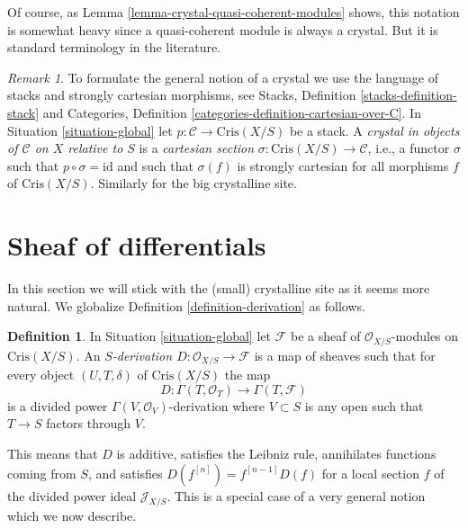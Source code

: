 \documentclass{stacks-project}
\theoremstyle{plain}
\theoremstyle{definition}
\newtheorem{definition}[subsection]{Definition}
\theoremstyle{remark}
\newtheorem{remark}[subsection]{Remark}
\numberwithin{equation}{subsection}
\begin{document}
\noindent
Of course, as Lemma \ref{lemma-crystal-quasi-coherent-modules} shows, this
notation is somewhat heavy since a quasi-coherent module is always a crystal.
But it is standard terminology in the literature.

\begin{remark}
\label{remark-crystal}
To formulate the general notion of a crystal we use the language
of stacks and strongly cartesian morphisms, see
Stacks, Definition \ref{stacks-definition-stack} and
Categories, Definition \ref{categories-definition-cartesian-over-C}.
In Situation \ref{situation-global} let
$p : \mathcal{C} \to \text{Cris}(X/S)$ be a stack.
A {\it crystal in objects of $\mathcal{C}$ on $X$ relative to $S$}
is a {\it cartesian section} $\sigma : \text{Cris}(X/S) \to \mathcal{C}$,
i.e., a functor $\sigma$ such that $p \circ \sigma = \text{id}$
and such that $\sigma(f)$ is strongly cartesian for all
morphisms $f$ of $\text{Cris}(X/S)$. Similarly for the big crystalline site.
\end{remark}





\section{Sheaf of differentials}
\label{section-differentials-sheaf}

\noindent
In this section we will stick with the (small) crystalline site
as it seems more natural. We globalize
Definition \ref{definition-derivation} as follows.

\begin{definition}
\label{definition-global-derivation}
In Situation \ref{situation-global} let
$\mathcal{F}$ be a sheaf of $\mathcal{O}_{X/S}$-modules on
$\text{Cris}(X/S)$. An
{\it $S$-derivation $D : \mathcal{O}_{X/S} \to \mathcal{F}$}
is a map of sheaves such that for every object $(U, T, \delta)$ of
$\text{Cris}(X/S)$ the map
$$
D : \Gamma(T, \mathcal{O}_T) \longrightarrow \Gamma(T, \mathcal{F})
$$
is a divided power $\Gamma(V, \mathcal{O}_V)$-derivation where $V \subset S$
is any open such that $T \to S$ factors through $V$.
\end{definition}

\noindent
This means that $D$ is additive, satisfies the Leibniz rule, annihilates
functions coming from $S$, and satisfies $D(f^{[n]}) = f^{[n - 1]}D(f)$
for a local section $f$ of the divided power ideal $\mathcal{J}_{X/S}$.
This is a special case of a very general notion which we now describe.
\end{document}
